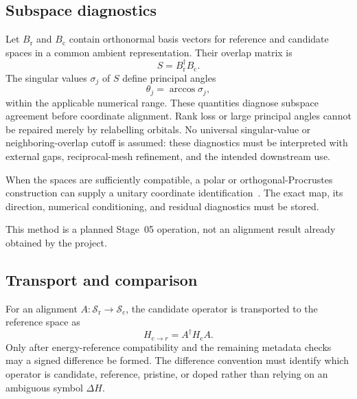 \subsection{Subspace diagnostics}


Let $B_{\mathrm r}$ and $B_{\mathrm c}$ contain orthonormal basis vectors for
reference and candidate spaces in a common ambient representation. Their
overlap matrix is
\begin{equation}
  S=B_{\mathrm r}^{\dagger}B_{\mathrm c}.
\end{equation}
The singular values $\sigma_j$ of $S$ define principal
angles~\cite{bjork1973}
\begin{equation}
  \theta_j=\arccos\sigma_j,
\end{equation}
within the applicable numerical range. These quantities diagnose subspace
agreement before coordinate alignment. Rank loss or large principal angles
cannot be repaired merely by relabelling orbitals. No universal singular-value
or neighboring-overlap cutoff is assumed: these diagnostics must be interpreted
with external gaps, reciprocal-mesh refinement, and the intended downstream
use.

When the spaces are sufficiently compatible, a polar or orthogonal-Procrustes
construction can supply a unitary coordinate
identification~\cite{higham1986}. The exact map,
its direction, numerical conditioning, and residual diagnostics must be stored.

This method is a planned Stage~05 operation, not an alignment result already
obtained by the project.

\subsection{Transport and comparison}


For an alignment $A:\mathcal S_{\mathrm r}\rightarrow\mathcal S_{\mathrm c}$,
the candidate operator is transported to the reference space as
\begin{equation}
  H_{\mathrm c\rightarrow r}=A^{\dagger}H_{\mathrm c}A.
\end{equation}
Only after energy-reference compatibility and the remaining metadata checks may
a signed difference be formed. The difference convention must identify which
operator is candidate, reference, pristine, or doped rather than relying on an
ambiguous symbol $\Delta H$.

